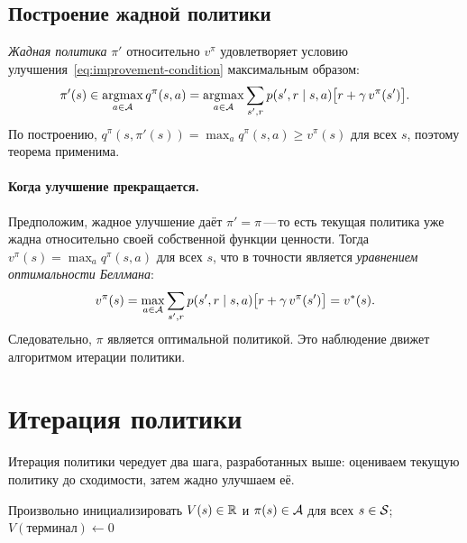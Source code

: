 \subsection*{Построение жадной политики}

\emph{Жадная политика} $\pi'$ относительно $v^\pi$ удовлетворяет условию улучшения~\eqref{eq:improvement-condition} максимальным образом:
\begin{equation}
\label{eq:greedy-policy}
\pi'(s) \in \operatorname*{argmax}_{a \in \mathcal{A}} q^\pi(s,a)
= \operatorname*{argmax}_{a \in \mathcal{A}} \sum_{s',r} p(s',r \mid s,a)\bigl[r + \gamma\,v^\pi(s')\bigr].
\end{equation}
По построению, $q^\pi(s, \pi'(s)) = \max_a q^\pi(s,a) \ge v^\pi(s)$ для всех $s$, поэтому теорема применима.

\paragraph{Когда улучшение прекращается.}
Предположим, жадное улучшение даёт $\pi' = \pi$\,---\,то есть текущая политика уже жадна относительно своей собственной функции ценности.  Тогда $v^\pi(s) = \max_a q^\pi(s,a)$ для всех $s$, что в точности является \emph{уравнением оптимальности Беллмана}:
\[
v^\pi(s) = \max_{a \in \mathcal{A}} \sum_{s',r} p(s',r \mid s,a)\bigl[r + \gamma\, v^\pi(s')\bigr] = v^*(s).
\]
Следовательно, $\pi$ является оптимальной политикой.  Это наблюдение движет алгоритмом итерации политики.

\section{Итерация политики}
\label{sec:policy-iteration}

Итерация политики чередует два шага, разработанных выше: оцениваем текущую политику до сходимости, затем жадно улучшаем её.

\begin{algorithm}[ht]
\caption{Итерация политики}
\label{alg:policy-iteration}
Произвольно инициализировать $V(s) \in \mathbb{R}$ и $\pi(s) \in \mathcal{A}$ для всех $s \in \mathcal{S}$; $V(\mbox{терминал}) \leftarrow 0$\;
\end{algorithm}

